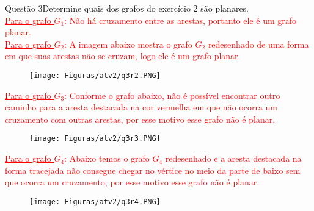 \documentclass[12pt]{article}
\begin{document}
\begin{section}{Questão 3}{Determine quais dos grafos do exercício 2 são planares.}\\


\noindent \textcolor{red}{\underline{Para o grafo $G_1$}: Não há cruzamento entre as arestas, portanto ele é um grafo planar.}\\

\noindent \textcolor{red}{\underline{Para o grafo $G_2$}: A imagem abaixo mostra o grafo $G_2$ redesenhado de uma forma em que suas arestas não se cruzam, logo ele é um grafo planar.}

\begin{figure}[H]
    \centering
    \texttt{[image: Figuras/atv2/q3r2.PNG]}
\end{figure}

\noindent \textcolor{red}{\underline{Para o grafo $G_3$}: Conforme o grafo abaixo, não é possível encontrar outro caminho para a aresta destacada na cor vermelha em que não ocorra um cruzamento com outras arestas, por esse motivo esse grafo não é planar.}

\begin{figure}[H]
    \centering
    \texttt{[image: Figuras/atv2/q3r3.PNG]}
\end{figure}

\newpage 

\noindent \textcolor{red}{\underline{Para o grafo $G_4$}: Abaixo temos o grafo $G_4$ redesenhado e a aresta destacada na forma tracejada não consegue chegar no vértice no meio da parte de baixo sem que ocorra um cruzamento; por esse motivo esse grafo não é planar.}

\begin{figure}[H]
    \centering
    \texttt{[image: Figuras/atv2/q3r4.PNG]}
\end{figure}

\end{section}
\newpage
\end{document}
